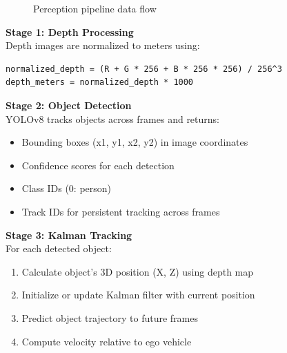 \begin{figure}[h]
    \centering
    \caption{Perception pipeline data flow}
\end{figure}

\textbf{Stage 1: Depth Processing}\\
Depth images are normalized to meters using:
\begin{verbatim}
normalized_depth = (R + G * 256 + B * 256 * 256) / 256^3
depth_meters = normalized_depth * 1000
\end{verbatim}

\textbf{Stage 2: Object Detection}\\
YOLOv8 tracks objects across frames and returns:
\begin{itemize}
    \item Bounding boxes (x1, y1, x2, y2) in image coordinates
    \item Confidence scores for each detection
    \item Class IDs (0: person)
    \item Track IDs for persistent tracking across frames
\end{itemize}

\textbf{Stage 3: Kalman Tracking}\\
For each detected object:
\begin{enumerate}
    \item Calculate object's 3D position (X, Z) using depth map
    \item Initialize or update Kalman filter with current position
    \item Predict object trajectory to future frames
    \item Compute velocity relative to ego vehicle
\end{enumerate}

